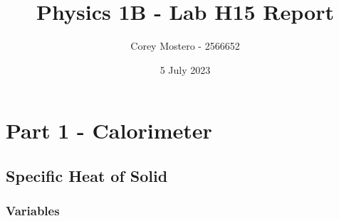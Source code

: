 \documentclass{article}
\title{Physics 1B - Lab H15 Report}
\author{Corey Mostero - 2566652}
\date{5 July 2023}
\begin{document}
\newcommand{\hr}{\par\noindent\rule{\textwidth}{0.4pt}}

\newcommand{\bc}[1]{
	\begin{equation*}
		\begin{boxed}
			{#1}
		\end{boxed}
	\end{equation*}
}

\newcommand{\cond}[2]{
	\ifmmode
		{#1} \quad {#2}
	\else
		$$ {#1} \quad {#2} $$
	\fi
}

\newcommand{\matr}[1]{
	\ifmmode \bm{#1}
	\else \textit{\textbf{#1}}
	\fi
}
\newcommand{\vect}[1]{
	\ifmmode \mathbf{#1}
	\else \textbf{#1}
	\fi
}


\maketitle
\newpage

\section{Part 1 - Calorimeter}

\subsection{Specific Heat of Solid}

\subsubsection{Variables}
\end{document}
